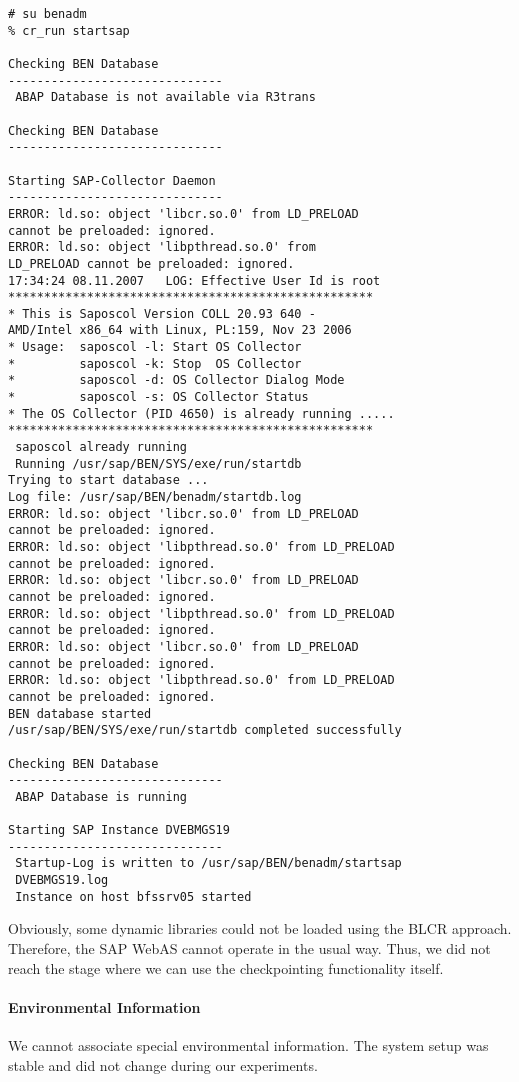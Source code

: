 \begin{lstlisting}
# su benadm
% cr_run startsap

Checking BEN Database
------------------------------
 ABAP Database is not available via R3trans

Checking BEN Database
------------------------------

Starting SAP-Collector Daemon
------------------------------
ERROR: ld.so: object 'libcr.so.0' from LD_PRELOAD
cannot be preloaded: ignored.
ERROR: ld.so: object 'libpthread.so.0' from 
LD_PRELOAD cannot be preloaded: ignored.
17:34:24 08.11.2007   LOG: Effective User Id is root
***************************************************
* This is Saposcol Version COLL 20.93 640 - 
AMD/Intel x86_64 with Linux, PL:159, Nov 23 2006
* Usage:  saposcol -l: Start OS Collector
*         saposcol -k: Stop  OS Collector
*         saposcol -d: OS Collector Dialog Mode
*         saposcol -s: OS Collector Status
* The OS Collector (PID 4650) is already running .....
***************************************************
 saposcol already running
 Running /usr/sap/BEN/SYS/exe/run/startdb
Trying to start database ...
Log file: /usr/sap/BEN/benadm/startdb.log
ERROR: ld.so: object 'libcr.so.0' from LD_PRELOAD
cannot be preloaded: ignored.
ERROR: ld.so: object 'libpthread.so.0' from LD_PRELOAD
cannot be preloaded: ignored.
ERROR: ld.so: object 'libcr.so.0' from LD_PRELOAD 
cannot be preloaded: ignored.
ERROR: ld.so: object 'libpthread.so.0' from LD_PRELOAD 
cannot be preloaded: ignored.
ERROR: ld.so: object 'libcr.so.0' from LD_PRELOAD 
cannot be preloaded: ignored.
ERROR: ld.so: object 'libpthread.so.0' from LD_PRELOAD 
cannot be preloaded: ignored.
BEN database started
/usr/sap/BEN/SYS/exe/run/startdb completed successfully

Checking BEN Database
------------------------------
 ABAP Database is running

Starting SAP Instance DVEBMGS19
------------------------------
 Startup-Log is written to /usr/sap/BEN/benadm/startsap
 DVEBMGS19.log
 Instance on host bfssrv05 started
\end{lstlisting}
Obviously, some dynamic libraries could not be loaded using the BLCR approach. Therefore, the SAP WebAS cannot operate in the usual way. Thus, we did not reach the stage where we can use the checkpointing functionality itself.

\paragraph{Environmental Information}
We cannot associate special environmental information. The system setup was stable and did not change during our experiments.

